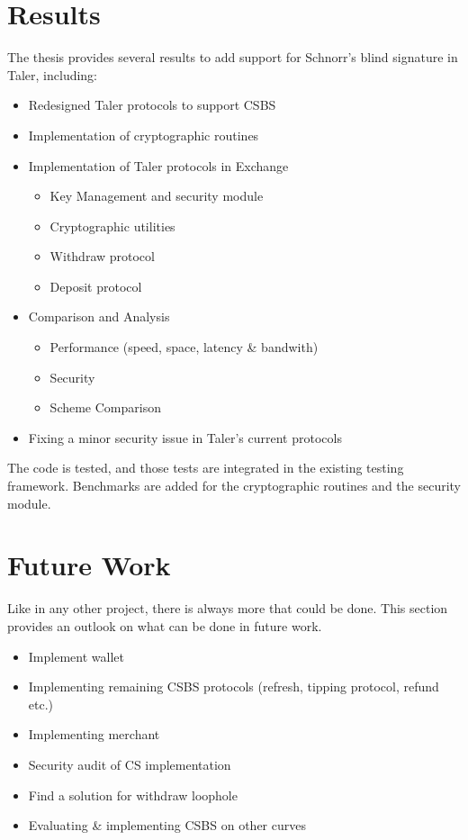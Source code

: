 \section{Results}
The thesis provides several results to add support for Schnorr's blind signature in Taler, including:
\begin{itemize}
    \item Redesigned Taler protocols to support \gls{CSBS}
    \item Implementation of cryptographic routines
    \item Implementation of Taler protocols in Exchange
    \begin{itemize}
        \item Key Management and security module
        \item Cryptographic utilities
        \item Withdraw protocol
        \item Deposit protocol
    \end{itemize}
    \item Comparison and Analysis
    \begin{itemize}
        \item Performance (speed, space, latency \& bandwith)
        \item Security 
        \item Scheme Comparison
    \end{itemize}
    \item Fixing a minor security issue in Taler's current protocols
\end{itemize}
The code is tested, and those tests are integrated in the existing testing framework.
Benchmarks are added for the cryptographic routines and the security module.

\section{Future Work}
Like in any other project, there is always more that could be done.
This section provides an outlook on what can be done in future work.

\begin{itemize}
    \item Implement wallet
    \item Implementing remaining \gls{CSBS} protocols (refresh, tipping protocol, refund etc.)
    \item Implementing merchant
    \item Security audit of CS implementation
    \item Find a solution for withdraw loophole
    \item Evaluating \& implementing \gls{CSBS} on other curves
\end{itemize}

